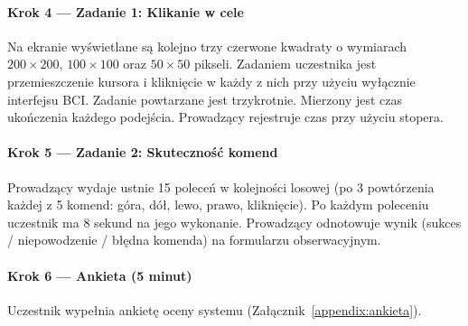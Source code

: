 \paragraph{Krok 4 — Zadanie 1: Klikanie w cele}
Na ekranie wyświetlane są kolejno trzy czerwone kwadraty 
o wymiarach $200\times200$, $100\times100$ oraz $50\times50$ 
pikseli. Zadaniem uczestnika jest przemieszczenie kursora 
i kliknięcie w każdy z nich przy użyciu wyłącznie interfejsu 
BCI. Zadanie powtarzane jest trzykrotnie. Mierzony jest czas 
ukończenia każdego podejścia. Prowadzący rejestruje czas 
przy użyciu stopera.

\paragraph{Krok 5 — Zadanie 2: Skuteczność komend}
Prowadzący wydaje ustnie 15 poleceń w kolejności losowej 
(po 3 powtórzenia każdej z 5 komend: góra, dół, lewo, prawo, 
kliknięcie). Po każdym poleceniu uczestnik ma 8 sekund na 
jego wykonanie. Prowadzący odnotowuje wynik (sukces / 
niepowodzenie / błędna komenda) na formularzu obserwacyjnym.

\paragraph{Krok 6 — Ankieta (5 minut)}
Uczestnik wypełnia ankietę oceny systemu 
(Załącznik~\ref{appendix:ankieta}).